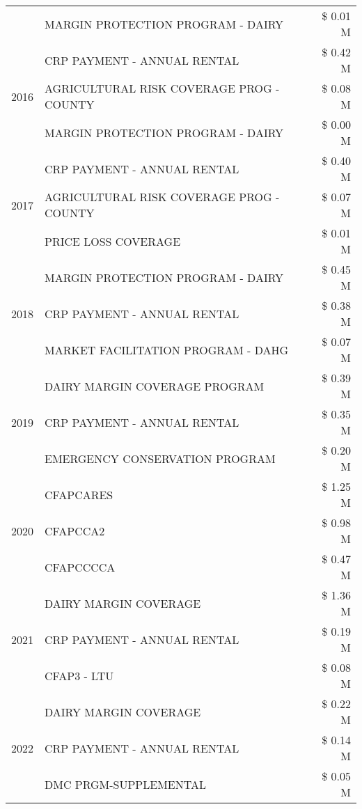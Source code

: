 \begin{tabular}{llr}
 & MARGIN PROTECTION PROGRAM - DAIRY & \$ 0.01 M \\
\cline{1-3}
\multirow[t]{3}{*}{2016} & CRP PAYMENT - ANNUAL RENTAL & \$ 0.42 M \\
 & AGRICULTURAL RISK COVERAGE PROG - COUNTY & \$ 0.08 M \\
 & MARGIN PROTECTION PROGRAM - DAIRY & \$ 0.00 M \\
\cline{1-3}
\multirow[t]{3}{*}{2017} & CRP PAYMENT - ANNUAL RENTAL & \$ 0.40 M \\
 & AGRICULTURAL RISK COVERAGE PROG - COUNTY & \$ 0.07 M \\
 & PRICE LOSS COVERAGE & \$ 0.01 M \\
\cline{1-3}
\multirow[t]{3}{*}{2018} & MARGIN PROTECTION PROGRAM - DAIRY & \$ 0.45 M \\
 & CRP PAYMENT - ANNUAL RENTAL & \$ 0.38 M \\
 & MARKET FACILITATION PROGRAM - DAHG & \$ 0.07 M \\
\cline{1-3}
\multirow[t]{3}{*}{2019} & DAIRY MARGIN COVERAGE PROGRAM & \$ 0.39 M \\
 & CRP PAYMENT - ANNUAL RENTAL & \$ 0.35 M \\
 & EMERGENCY CONSERVATION PROGRAM & \$ 0.20 M \\
\cline{1-3}
\multirow[t]{3}{*}{2020} & CFAPCARES & \$ 1.25 M \\
 & CFAPCCA2 & \$ 0.98 M \\
 & CFAPCCCCA & \$ 0.47 M \\
\cline{1-3}
\multirow[t]{3}{*}{2021} & DAIRY MARGIN COVERAGE & \$ 1.36 M \\
 & CRP PAYMENT - ANNUAL RENTAL & \$ 0.19 M \\
 & CFAP3 - LTU & \$ 0.08 M \\
\cline{1-3}
\multirow[t]{3}{*}{2022} & DAIRY MARGIN COVERAGE & \$ 0.22 M \\
 & CRP PAYMENT - ANNUAL RENTAL & \$ 0.14 M \\
 & DMC PRGM-SUPPLEMENTAL & \$ 0.05 M \\
\cline{1-3}
\bottomrule
\end{tabular}
